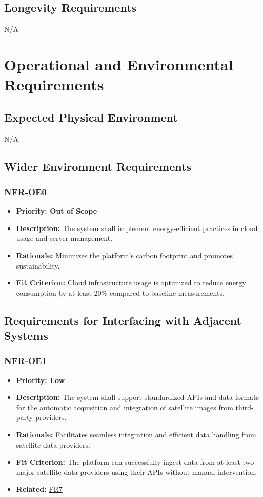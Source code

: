 \documentclass[12pt]{article}
\begin{document}
\subsection{Longevity Requirements}
N/A


\section{Operational and Environmental Requirements}
\subsection{Expected Physical Environment}
N/A
\subsection{Wider Environment Requirements}
\subsubsection*{NFR-OE0}
\label{sec:OE0}
\begin{itemize}
  \item \textbf{Priority: Out of Scope}
  \item \textbf{Description:} The system shall implement energy-efficient practices in cloud usage and server management.
  \item \textbf{Rationale:} Minimizes the platform’s carbon footprint and promotes sustainability.
  \item \textbf{Fit Criterion:} Cloud infrastructure usage is optimized to reduce energy consumption by at least 20\% compared to baseline measurements.
\end{itemize}
\subsection{Requirements for Interfacing with Adjacent Systems}
\subsubsection*{NFR-OE1}
\label{sec:OE1}
\begin{itemize}
  \item \textbf{Priority: Low}
  \item \textbf{Description:} The system shall support standardized APIs and data formats for the automatic acquisition and integration of satellite images from third-party providers.
  \item \textbf{Rationale:} Facilitates seamless integration and efficient data handling from satellite data providers.
  \item \textbf{Fit Criterion:} The platform can successfully ingest data from at least two major satellite data providers using their APIs without manual intervention.
  \item \textbf{Related:} \hyperref[sec:FR7]{FR7}
\end{itemize}
\end{document}
